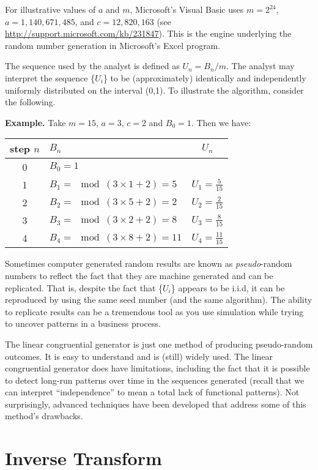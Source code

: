 \documentclass[]{book}
\theoremstyle{definition}
\theoremstyle{definition}
\theoremstyle{definition}
\theoremstyle{remark}
\begin{document}
For illustrative values of \(a\) and \(m\), Microsoft's Visual Basic
uses \(m=2^{24}\), \(a=1,140,671,485\), and \(c = 12,820,163\) (see
\url{http://support.microsoft.com/kb/231847}). This is the engine
underlying the random number generation in Microsoft's Excel program.

The sequence used by the analyst is defined as \(U_n=B_n/m.\) The
analyst may interpret the sequence \{\(U_{i}\)\} to be (approximately)
identically and independently uniformly distributed on the interval
(0,1). To illustrate the algorithm, consider the following.

\textbf{Example.} Take \(m=15\), \(a=3\), \(c=2\) and \(B_0=1\). Then we
have:

\begin{longtable}[]{@{}clc@{}}
\toprule
step \(n\) & \(B_n\) & \(U_n\)\tabularnewline
\midrule
\endhead
0 & \(B_0=1\) &\tabularnewline
1 & \(B_1 =\mod(3 \times 1 +2) = 5\) &
\(U_1 = \frac{5}{15}\)\tabularnewline
2 & \(B_2 =\mod(3 \times 5 +2) = 2\) &
\(U_2 = \frac{2}{15}\)\tabularnewline
3 & \(B_3 =\mod(3 \times 2 +2) = 8\) &
\(U_3 = \frac{8}{15}\)\tabularnewline
4 & \(B_4 =\mod(3 \times 8 +2) = 11\) &
\(U_4 = \frac{11}{15}\)\tabularnewline
\bottomrule
\end{longtable}

Sometimes computer generated random results are known as
\emph{pseudo}-random numbers to reflect the fact that they are machine
generated and can be replicated. That is, despite the fact that
\{\(U_{i}\)\} appears to be i.i.d, it can be reproduced by using the
same seed number (and the same algorithm). The ability to replicate
results can be a tremendous tool as you use simulation while trying to
uncover patterns in a business process.

The linear congruential generator is just one method of producing
pseudo-random outcomes. It is easy to understand and is (still) widely
used. The linear congruential generator does have limitations, including
the fact that it is possible to detect long-run patterns over time in
the sequences generated (recall that we can interpret ``independence''
to mean a total lack of functional patterns). Not surprisingly, advanced
techniques have been developed that address some of this method's
drawbacks.

\section{Inverse Transform}\label{inverse-transform}
\end{document}

